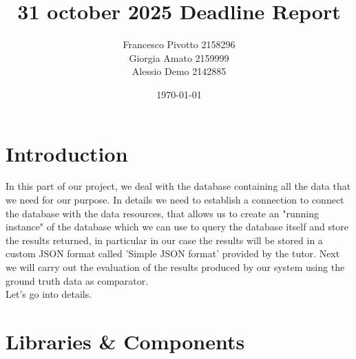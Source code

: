 \documentclass[12pt,a4paper]{article}
\title{31 october 2025 Deadline Report}
\author{Francesco Pivotto 2158296\\ Giorgia Amato 2159999\\ Alessio Demo 2142885 }
\date{\today}
\begin{document}
\maketitle

\tableofcontents
\newpage

\section{Introduction }
In this part of our project, we deal with the database containing all the data that we need for our purpose.
In details we need to establish a connection to connect the database with the data resources, that allows us to create an "running instance" of the database which we can use to query the database itself and store
the results returned, in particular in our case the results will be stored in a custom JSON format called 'Simple JSON format' provided by the tutor.
Next we will carry out the evaluation of the results  produced by our system using the ground truth data as comparator.\\
Let's go into details.

\section{Libraries \& Components}
\end{document}
